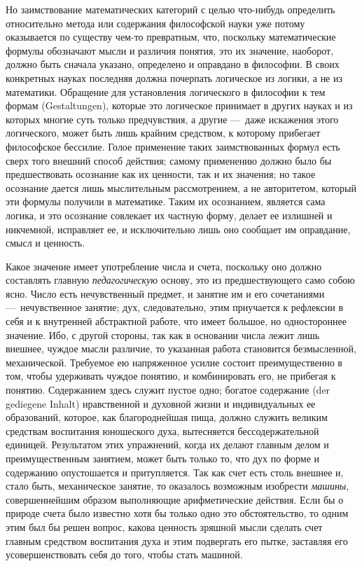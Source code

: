 {Но заимствование математических категорий с целью что-нибудь определить
относительно метода или содержания философской науки уже потому оказывается
по существу чем-то превратным, что, поскольку математические формулы
обозначают мысли и различия понятия, это их значение, наоборот, должно быть
сначала указано, определено и оправдано в философии. В своих конкретных
науках последняя должна почерпать логическое из логики, а не из математики.
Обращение для установления логического в философии к тем формам
(Gestaltungen), которые это логическое принимает в других науках и из
которых многие суть только предчувствия, а другие —~даже искажения этого
логического, может быть лишь крайним средством, к которому прибегает
философское бессилие. Голое применение таких заимствованных формул есть
сверх того внешний способ действия; самому применению должно было бы
предшествовать осознание как их ценности, так и их значения; но такое
осознание дается лишь мыслительным рассмотрением, а не авторитетом, который
эти формулы получили в математике. Таким их осознанием, является сама
логика, и это осознание совлекает их частную форму, делает ее излишней и
никчемной, исправляет ее, и исключительно лишь оно сообщает им оправдание,
смысл и ценность.

Какое значение имеет употребление числа и счета, поскольку оно должно
составлять главную {\em педагогическую} основу, это из
предшествующего само собою ясно. Число есть нечувственный предмет, и
занятие им и его сочетаниями —~нечувственное занятие; дух, следовательно,
этим приучается к рефлексии в себя и к внутренней абстрактной работе, что
имеет большое, но одностороннее значение. Ибо, с другой стороны, так как в
основании числа лежит лишь внешнее, чуждое мысли различие, то указанная
работа становится безмысленной, механической. Требуемое ею напряженное
усилие состоит преимущественно в том, чтобы удерживать чуждое понятию, и
комбинировать его, не прибегая к понятию. Содержанием здесь служит пустое
одно; богатое содержание (der gediegene Inhalt) нравственной и духовной
жизни и индивидуальных ее образований, которое, как благороднейшая пища,
должно служить великим средствам воспитания юношеского духа, вытесняется
бессодержательной единицей. Результатом этих упражнений, когда их делают
главным делом и преимущественным занятием, может быть только то, что дух по
форме и содержанию опустошается и притупляется. Так как счет есть столь
внешнее и, стало быть, механическое занятие, то оказалось возможным
изобрести {\em машины}, совершеннейшим образом
выполняющие арифметические действия. Если бы о природе счета было известно
хотя бы только одно это обстоятельство, то одним этим был бы решен вопрос,
какова ценность зряшной мысли сделать счет главным средством воспитания
духа и этим подвергать его пытке, заставляя его усовершенствовать себя до
того, чтобы стать машиной.

}
